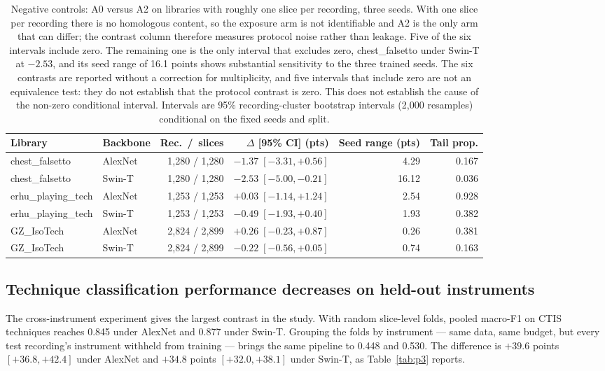 \begin{table}[t]
\centering
\caption{Negative controls: A0 versus A2 on libraries with roughly one slice per recording, three
seeds. With one slice per recording there is no homologous content, so the exposure arm is not
identifiable and A2 is the only arm that can differ; the contrast column therefore measures protocol
noise rather than leakage. Five of the six intervals include zero. The remaining one is the only
interval that excludes zero, chest\_falsetto under Swin-T at $-2.53$, and its seed range of 16.1 points shows
substantial sensitivity to the three trained seeds. The six contrasts are reported without a
correction for multiplicity, and five intervals that include zero are not an equivalence test:
they do not establish that the protocol contrast is zero. This does not establish the cause of the
non-zero conditional interval. Intervals are 95\% recording-cluster bootstrap intervals
(2{,}000 resamples) conditional on the fixed seeds and split.}
\label{tab:neg}
\footnotesize
\setlength{\tabcolsep}{3.6pt}
\begin{tabular}{llrrrr}
\toprule
Library & Backbone & Rec.\, /\, slices & $\Delta$ [95\% CI] (pts) & Seed range (pts) & Tail prop. \\
\midrule
chest\_falsetto     & AlexNet & 1{,}280 / 1{,}280 & $-1.37\;[-3.31,+0.56]$ & 4.29  & 0.167 \\
chest\_falsetto     & Swin-T  & 1{,}280 / 1{,}280 & $-2.53\;[-5.00,-0.21]$ & 16.12 & 0.036 \\
erhu\_playing\_tech & AlexNet & 1{,}253 / 1{,}253 & $+0.03\;[-1.14,+1.24]$ & 2.54  & 0.928 \\
erhu\_playing\_tech & Swin-T  & 1{,}253 / 1{,}253 & $-0.49\;[-1.93,+0.40]$ & 1.93  & 0.382 \\
GZ\_IsoTech         & AlexNet & 2{,}824 / 2{,}899 & $+0.26\;[-0.23,+0.87]$ & 0.26  & 0.381 \\
GZ\_IsoTech         & Swin-T  & 2{,}824 / 2{,}899 & $-0.22\;[-0.56,+0.05]$ & 0.74  & 0.163 \\
\bottomrule
\end{tabular}
\end{table}

\subsection{Technique classification performance decreases on held-out instruments}

The cross-instrument experiment gives the largest contrast in the study. With random slice-level
folds, pooled macro-F1 on CTIS techniques reaches 0.845 under AlexNet and 0.877 under Swin-T.
Grouping the folds by instrument --- same data, same budget, but every test recording's
instrument withheld from training --- brings the same pipeline to 0.448 and 0.530. The difference is $+39.6$ points
$[+36.8,+42.4]$ under AlexNet and $+34.8$ points $[+32.0,+38.1]$ under Swin-T, as
Table~\ref{tab:p3} reports.

